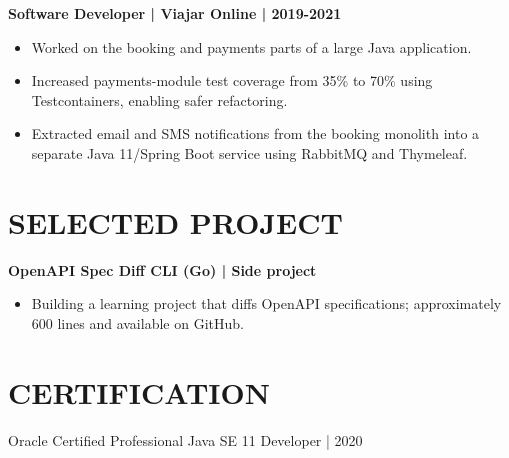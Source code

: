 \documentclass[11pt,a4paper]{article}
\begin{document}
\textbf{Software Developer | Viajar Online | 2019-2021}
\begin{itemize}
\item Worked on the booking and payments parts of a large Java application.
\item Increased payments-module test coverage from 35\% to 70\% using Testcontainers, enabling safer refactoring.
\item Extracted email and SMS notifications from the booking monolith into a separate Java 11/Spring Boot service using RabbitMQ and Thymeleaf.
\end{itemize}

\section*{SELECTED PROJECT}
\textbf{OpenAPI Spec Diff CLI (Go) | Side project}
\begin{itemize}
\item Building a learning project that diffs OpenAPI specifications; approximately 600 lines and available on GitHub.
\end{itemize}

\section*{CERTIFICATION}
Oracle Certified Professional Java SE 11 Developer | 2020
\end{document}
